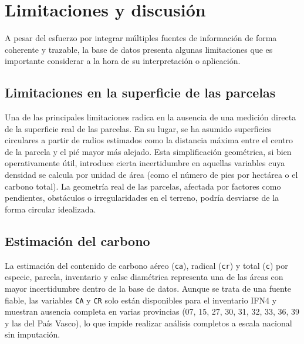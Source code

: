 \section{Limitaciones y discusión}



A pesar del esfuerzo por integrar múltiples fuentes de información de forma coherente y trazable, la base de datos presenta algunas limitaciones que es importante considerar a la hora de su interpretación o aplicación.

\subsection*{Limitaciones en la superficie de las parcelas}

Una de las principales limitaciones radica en la ausencia de una medición directa de la superficie real de las parcelas. En su lugar, se ha asumido superficies circulares a partir de radios estimados como la distancia máxima entre el centro de la parcela y el pié mayor más alejado. Esta simplificación geométrica, si bien operativamente útil, introduce cierta incertidumbre en aquellas variables cuya densidad se calcula por unidad de área (como el número de pies por hectárea o el carbono total). La geometría real de las parcelas, afectada por factores como pendientes, obstáculos o irregularidades en el terreno, podría desviarse de la forma circular idealizada.

\subsection*{Estimación del carbono}

La estimación del contenido de carbono aéreo (\texttt{ca}), radical (\texttt{cr}) y total (\texttt{c}) por especie, parcela, inventario y calse diamétrica representa una de las áreas con mayor incertidumbre dentro de la base de datos. Aunque se trata de una fuente fiable, las variables \texttt{CA} y \texttt{CR} solo están disponibles para el inventario IFN4 y muestran ausencia completa en varias provincias (07, 15, 27, 30, 31, 32, 33, 36, 39 y las del País Vasco), lo que impide realizar análisis completos a escala nacional sin imputación.  
\medskip

